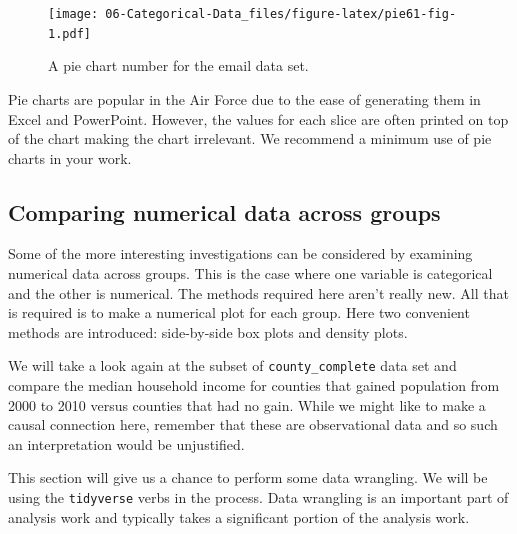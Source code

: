 \documentclass[
]{book}
\newenvironment{Shaded}{\begin{snugshade}}{\end{snugshade}}
\newcommand{\AttributeTok}[1]{\textcolor[rgb]{0.77,0.63,0.00}{#1}}
\newcommand{\DecValTok}[1]{\textcolor[rgb]{0.00,0.00,0.81}{#1}}
\newcommand{\FloatTok}[1]{\textcolor[rgb]{0.00,0.00,0.81}{#1}}
\newcommand{\FunctionTok}[1]{\textcolor[rgb]{0.00,0.00,0.00}{#1}}
\newcommand{\NormalTok}[1]{#1}
\newcommand{\SpecialCharTok}[1]{\textcolor[rgb]{0.00,0.00,0.00}{#1}}
\begin{document}
\begin{Shaded}
\end{Shaded}

\begin{figure}
\centering
\texttt{[image: 06-Categorical-Data\_files/figure-latex/pie61-fig-1.pdf]}
\caption{\label{fig:pie61-fig}A pie chart number for the email data set.}
\end{figure}

Pie charts are popular in the Air Force due to the ease of generating them in Excel and PowerPoint. However, the values for each slice are often printed on top of the chart making the chart irrelevant. We recommend a minimum use of pie charts in your work.

\hypertarget{comparing-numerical-data-across-groups}{%
\subsection{Comparing numerical data across groups}\label{comparing-numerical-data-across-groups}}

Some of the more interesting investigations can be considered by examining numerical data across groups. This is the case where one variable is categorical and the other is numerical. The methods required here aren't really new. All that is required is to make a numerical plot for each group. Here two convenient methods are introduced: side-by-side box plots and density plots.

We will take a look again at the subset of \texttt{county\_complete} data set and compare the median household income for counties that gained population from 2000 to 2010 versus counties that had no gain. While we might like to make a causal connection here, remember that these are observational data and so such an interpretation would be unjustified.

This section will give us a chance to perform some data wrangling. We will be using the \texttt{tidyverse} verbs in the process. Data wrangling is an important part of analysis work and typically takes a significant portion of the analysis work.
\end{document}
